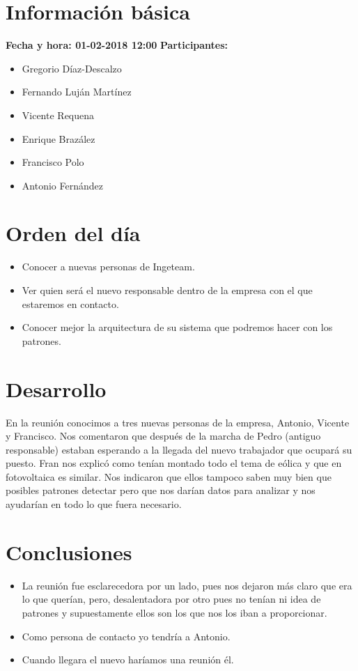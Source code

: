 \documentclass[a4paper]{article}
\begin{document}
\section{Información básica}
\textbf{Fecha y hora: 01-02-2018 12:00}
\newline
\textbf{Participantes:}
\begin{itemize}
    \item Gregorio Díaz-Descalzo
    \item Fernando Luján Martínez
    \item Vicente Requena
    \item Enrique Brazález
    \item Francisco Polo
    \item Antonio Fernández
\end{itemize}
\section{Orden del día}
\begin{itemize}
\item Conocer a nuevas personas de Ingeteam.
\item Ver quien será el nuevo responsable dentro de la empresa con el que estaremos en contacto.
\item Conocer mejor la arquitectura de su sistema que podremos hacer con los patrones.
\end{itemize}
\section{Desarrollo}
En la reunión conocimos a tres nuevas personas de la empresa, Antonio, Vicente y Francisco.
Nos comentaron que después de la marcha de Pedro (antiguo responsable) estaban esperando a la llegada del nuevo trabajador que ocupará su puesto.
Fran nos explicó como tenían montado todo el tema de eólica y que en fotovoltaica es similar. Nos indicaron que ellos tampoco saben muy bien que posibles patrones detectar pero que nos darían datos para analizar y nos ayudarían en todo lo que fuera necesario. 
\section{Conclusiones}
\begin{itemize}
\item La reunión fue esclarecedora por un lado, pues nos dejaron más claro que era lo que querían, pero, desalentadora por otro pues no tenían ni idea de patrones y supuestamente ellos son los que nos los iban a proporcionar.
\item Como persona de contacto yo tendría a Antonio.
\item Cuando llegara el nuevo haríamos una reunión él.
\end{itemize}
\end{document}
